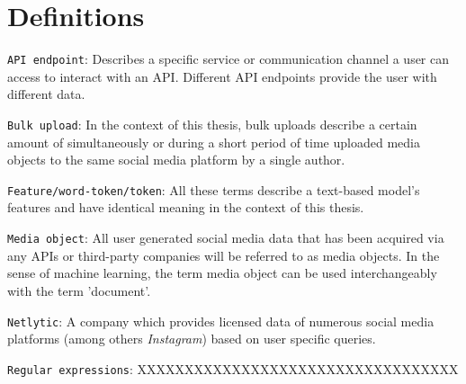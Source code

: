 \section*{Definitions} \label{definitions}
\texttt{API endpoint}: Describes a specific service or communication channel a user can access to interact with an API. Different API endpoints provide the user with different data.
\newline

\texttt{Bulk upload}: In the context of this thesis, bulk uploads describe a certain amount of simultaneously or during a short period of time uploaded media objects to the same social media platform by a single author.
\newline

\texttt{Feature/word-token/token}: All these terms describe a text-based model's features and have identical meaning in the context of this thesis.
\newline

\texttt{Media object}: All user generated social media data that has been acquired via any APIs or third-party companies will be referred to as media objects. In the sense of machine learning, the term media object can be used interchangeably with the term 'document'.
\newline

\texttt{Netlytic}: A company which provides licensed data of numerous social media platforms (among others \textit{Instagram}) based on user specific queries.
\newline

\texttt{Regular expressions}: XXXXXXXXXXXXXXXXXXXXXXXXXXXXXXXXXX




 \cleardoublepage

